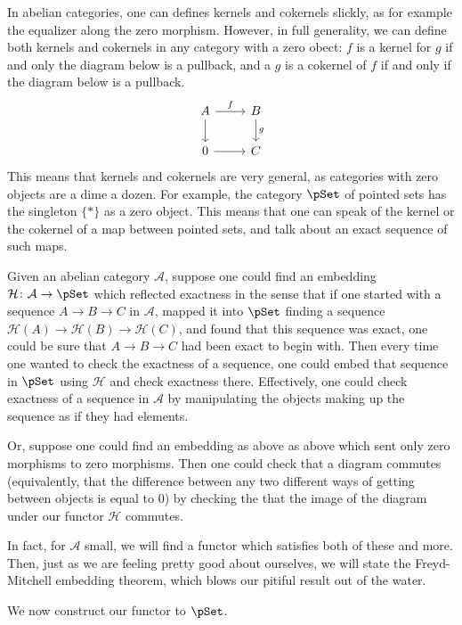 \documentclass[main.tex]{subfiles}
\begin{document}
In abelian categories, one can defines kernels and cokernels slickly, as for example the equalizer along the zero morphism. However, in full generality, we can define both kernels and cokernels in any category with a zero obect: $f$ is a kernel for $g$ if and only the diagram below is a pullback, and a $g$ is a cokernel of $f$ if and only if the diagram below is a pullback.
\begin{equation*}
  \begin{tikzcd}
    A
    \arrow[r, "f"]
    \arrow[d]
    & B
    \arrow[d, "g"]
    \\
    0
    \arrow[r]
    & C
  \end{tikzcd}
\end{equation*}
This means that kernels and cokernels are very general, as categories with zero objects are a dime a dozen. For example, the category $\pSet$ of pointed sets has the singleton $\{*\}$ as a zero object. This means that one can speak of the kernel or the cokernel of a map between pointed sets, and talk about an exact sequence of such maps.

Given an abelian category $\mathcal{A}$, suppose one could find an embedding $\mathcal{H}\colon \mathcal{A} \to \pSet$ which reflected exactness in the sense that if one started with a sequence $A \to B \to C$ in $\mathcal{A}$, mapped it into $\pSet$ finding a sequence $\mathcal{H}(A) \to \mathcal{H}(B) \to \mathcal{H}(C)$, and found that this sequence was exact, one could be sure that $A \to B \to C$ had been exact to begin with. Then every time one wanted to check the exactness of a sequence, one could embed that sequence in $\pSet$ using $\mathcal{H}$ and check exactness there. Effectively, one could check exactness of a sequence in $\mathcal{A}$ by manipulating the objects making up the sequence as if they had elements.

Or, suppose one could find an embedding as above as above which sent only zero morphisms to zero morphisms. Then one could check that a diagram commutes (equivalently, that the difference between any two different ways of getting between objects is equal to $0$) by checking the that the image of the diagram under our functor $\mathcal{H}$ commutes.

In fact, for $\mathcal{A}$ small, we will find a functor which satisfies both of these and more. Then, just as we are feeling pretty good about ourselves, we will state the Freyd-Mitchell embedding theorem, which blows our pitiful result out of the water.

We now construct our functor to $\pSet$.
\end{document}
